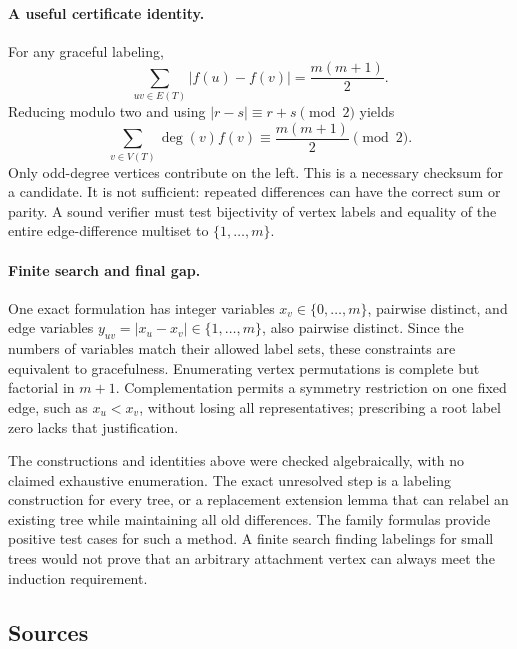 \documentclass[11pt,a4paper]{article}
\begin{document}
\paragraph{A useful certificate identity.}
For any graceful labeling,
\[
\sum_{uv\in E(T)}|f(u)-f(v)|=\frac{m(m+1)}2.
\]
Reducing modulo two and using $|r-s|\equiv r+s\pmod2$ yields
\[
\sum_{v\in V(T)}\deg(v)f(v)\equiv \frac{m(m+1)}2\pmod2.
\]
Only odd-degree vertices contribute on the left. This is a necessary checksum for a candidate. It is not sufficient: repeated differences can have the correct sum or parity. A sound verifier must test bijectivity of vertex labels and equality of the entire edge-difference multiset to $\{1,\ldots,m\}$.

\paragraph{Finite search and final gap.}
One exact formulation has integer variables $x_v\in\{0,\ldots,m\}$, pairwise distinct, and edge variables $y_{uv}=|x_u-x_v|\in\{1,\ldots,m\}$, also pairwise distinct. Since the numbers of variables match their allowed label sets, these constraints are equivalent to gracefulness. Enumerating vertex permutations is complete but factorial in $m+1$. Complementation permits a symmetry restriction on one fixed edge, such as $x_u<x_v$, without losing all representatives; prescribing a root label zero lacks that justification.

The constructions and identities above were checked algebraically, with no claimed exhaustive enumeration. The exact unresolved step is a labeling construction for every tree, or a replacement extension lemma that can relabel an existing tree while maintaining all old differences. The family formulas provide positive test cases for such a method. A finite search finding labelings for small trees would not prove that an arbitrary attachment vertex can always meet the induction requirement.

\subsection{Sources}
\end{document}
